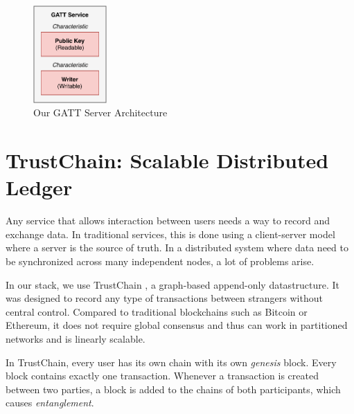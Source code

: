\begin{figure}
    \centering
    \includegraphics[width=0.25\textwidth]{diagrams/ipv8-gatt}
    \caption{Our GATT Server Architecture}
    \label{gatt_server}
\end{figure}





\section{TrustChain: Scalable Distributed Ledger}

Any service that allows interaction between users needs a way to record and exchange data. In traditional services, this is done using a client-server model where a server is the source of truth. In a distributed system where data need to be synchronized across many independent nodes, a lot of problems arise.

In our stack, we use TrustChain \cite{trustchain}, a graph-based append-only datastructure. It was designed to record any type of transactions between strangers without central control. Compared to traditional blockchains such as Bitcoin or Ethereum, it does not require global consensus and thus can work in partitioned networks and is linearly scalable.

In TrustChain, every user has its own chain with its own \textit{genesis} block. Every block contains exactly one transaction. Whenever a transaction is created between two parties, a block is added to the chains of both participants, which causes \textit{entanglement}.

